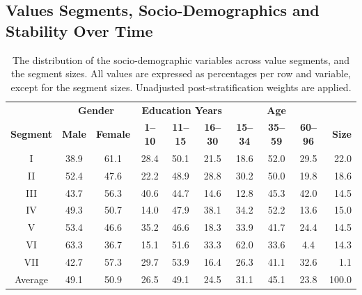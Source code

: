 \documentclass[12pt,letter]{article}\usepackage[]{graphicx}\usepackage[]{xcolor}
\begin{document}
\subsection*{Values Segments, Socio-Demographics and Stability Over Time}

\begin{table}
\renewcommand{\arraystretch}{1.25}
\centering
\footnotesize
\begin{tabular}{cccccccccr}
  \toprule
 & \multicolumn{2}{c}{\textbf{Gender}}  & \multicolumn{3}{c}{\textbf{Education Years}} & \multicolumn{3}{c}{\textbf{Age}} &  \\ \cmidrule(lr){2-3} \cmidrule(lr){4-6} \cmidrule(lr){7-9}
 \textbf{Segment} & \textbf{Male} & \textbf{Female} & \textbf{1--10} & \textbf{11--15} & \textbf{16--30} & \textbf{15--34} & \textbf{35--59} & \textbf{60--96} & \textbf{Size} \\ 
  \midrule
I & 38.9 & 61.1 & 28.4 & 50.1 & 21.5 & 18.6 & 52.0 & 29.5 & 22.0 \\ 
II & 52.4 & 47.6 & 22.2 & 48.9 & 28.8 & 30.2 & 50.0 & 19.8 & 18.6 \\ 
III & 43.7 & 56.3 & 40.6 & 44.7 & 14.6 & 12.8 & 45.3 & 42.0 & 14.5 \\ 
IV & 49.3 & 50.7 & 14.0 & 47.9 & 38.1 & 34.2 & 52.2 & 13.6 & 15.0 \\ 
V & 53.4 & 46.6 & 35.2 & 46.6 & 18.3 & 33.9 & 41.7 & 24.4 & 14.5 \\ 
VI & 63.3 & 36.7 & 15.1 & 51.6 & 33.3 & 62.0 & 33.6 & 4.4 & 14.3 \\ 
VII & 42.7 & 57.3 & 29.7 & 53.9 & 16.4 & 26.3 & 41.1 & 32.6 & 1.1 \\ \midrule
  Average & 49.1 & 50.9 & 26.5 & 49.1 & 24.5 & 31.1 & 45.1 & 23.8 & 100.0 \\ 
   \bottomrule
\end{tabular}
\caption{The distribution of the socio-demographic variables across value segments, and the segment sizes. All values are expressed as percentages per row and variable, except for the segment sizes. Unadjusted post-stratification weights are applied.}
\label{T:demo_vs_segs}
\end{table}
\end{document}
